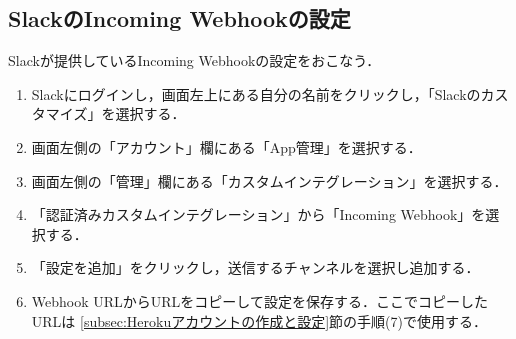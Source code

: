 \documentclass[12pt]{jsarticle}
\begin{document}
\subsection{SlackのIncoming Webhookの設定}\label{subsec:SlackのIncoming Webhookの設定}
Slackが提供しているIncoming Webhookの設定をおこなう．
\begin{enumerate}
  \item Slackにログインし，画面左上にある自分の名前をクリックし，「Slackのカスタマイズ」を選択する．
  \item 画面左側の「アカウント」欄にある「App管理」を選択する．
  \item 画面左側の「管理」欄にある「カスタムインテグレーション」を選択する．
  \item 「認証済みカスタムインテグレーション」から「Incoming Webhook」を選択する．
  \item 「設定を追加」をクリックし，送信するチャンネルを選択し追加する．
  \item Webhook URLからURLをコピーして設定を保存する．ここでコピーしたURLは
  \ref{subsec:Herokuアカウントの作成と設定}節の手順(7)で使用する．
\end{enumerate}
\end{document}
